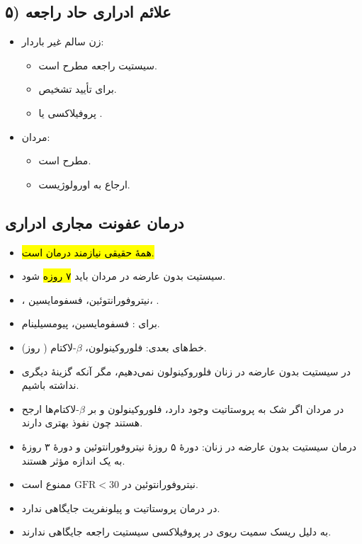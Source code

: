 \subsection*{۵) علائم ادراری حاد راجعه}
\begin{itemize}
\item زن سالم غیر باردار:
\begin{itemize}
\item سیستیت راجعه مطرح است.
\item {} برای تأیید تشخیص.
\item پروفیلاکسی یا .
\end{itemize}
\item مردان:
\begin{itemize}
\item {} مطرح است.
\item ارجاع به اورولوژیست.
\end{itemize}
\end{itemize}

\subsection*{درمان عفونت مجاری ادراری}
\begin{itemize}
\item \hl{همهٔ  حقیقی نیازمند درمان  است.}
\item سیستیت بدون عارضه در مردان باید \hl{۷ روزه}  شود.
\item {}، نیتروفورانتوئین، فسفومایسین، .
\item برای : فسفومایسین، پیومسیلینام.
\item خط‌های بعدی: فلوروکینولون، $\beta$-لاکتام ( روز).
\item در سیستیت بدون عارضه در زنان فلوروکینولون نمی‌دهیم، مگر آنکه گزینهٔ دیگری نداشته باشیم.
\item در مردان اگر شک به پروستاتیت وجود دارد، فلوروکینولون و  بر $\beta$-لاکتام‌ها ارجح هستند چون نفوذ بهتری دارند.
\item درمان سیستیت بدون عارضه در زنان: دورهٔ ۵ روزهٔ نیتروفورانتوئین و دورهٔ ۳ روزهٔ  به یک اندازه مؤثر هستند.
\item نیتروفورانتوئین در $\mathrm{GFR}<30$ ممنوع است.
\item در درمان پروستاتیت و پیلونفریت جایگاهی ندارد.
\item به دلیل ریسک سمیت ریوی در پروفیلاکسی سیستیت راجعه جایگاهی ندارند.
\end{itemize}

